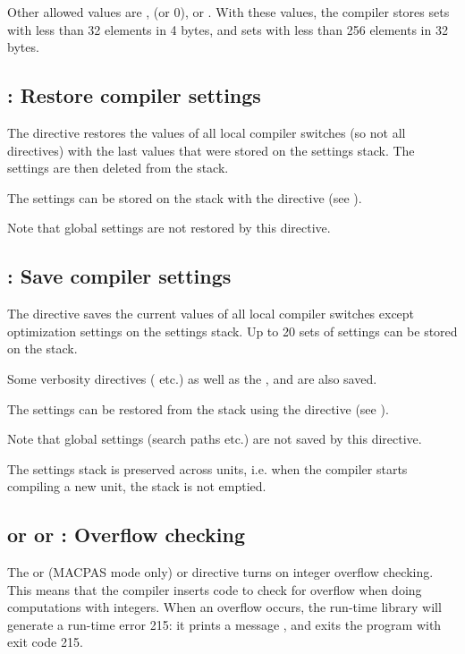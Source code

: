 Other allowed values are ,  (or 0), or . 
With these values, the compiler stores sets with less than 32 elements 
in 4 bytes, and sets with less than 256 elements in 32 bytes. 


\subsection{ : Restore compiler settings}
\label{se:Pop}
The  directive restores the values of all local compiler
switches (so not all directives) with the last values that were stored 
on the settings stack. The settings are then deleted from the stack.

The settings can be stored on the stack with the  directive
(see ).

Note that global settings are not restored by this directive.

\subsection{ : Save compiler settings}
\label{se:Push}
The  directive saves the current values of all local compiler
switches except optimization settings on the settings stack. 
Up to 20 sets of settings can be stored on the stack.

Some verbosity directives ( etc.) as well as the ,
 and  are also saved.

The settings can be restored from the stack using the  directive
(see ).

Note that global settings (search paths etc.) are not saved by this 
directive.



The settings stack is preserved across units, i.e. when the compiler starts
compiling a new unit, the stack is not emptied.

\subsection{ or  or : Overflow checking}
%
The  or  (MACPAS mode only) or  directive turns on
integer overflow checking. This means that the compiler inserts code
to check for overflow when doing computations with integers.
When an overflow occurs, the run-time library will generate a run-time error 215: 
it prints a message , and exits the program with exit code 215.

